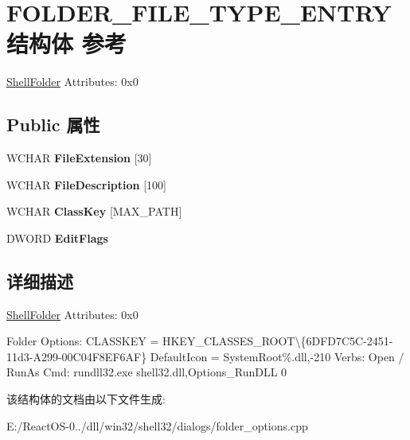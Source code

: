 \hypertarget{struct_f_o_l_d_e_r___f_i_l_e___t_y_p_e___e_n_t_r_y}{}\section{F\+O\+L\+D\+E\+R\+\_\+\+F\+I\+L\+E\+\_\+\+T\+Y\+P\+E\+\_\+\+E\+N\+T\+R\+Y结构体 参考}
\label{struct_f_o_l_d_e_r___f_i_l_e___t_y_p_e___e_n_t_r_y}


\hyperlink{struct_shell_folder}{Shell\+Folder} Attributes\+: 0x0  


\subsection*{Public 属性}
\begin{DoxyCompactItemize}
\item 
\mbox{\label{struct_f_o_l_d_e_r___f_i_l_e___t_y_p_e___e_n_t_r_y_a720540c9fd3743dfba91772a3ced099d}} 
W\+C\+H\+AR {\bfseries File\+Extension} \mbox{[}30\mbox{]}
\item 
\mbox{\label{struct_f_o_l_d_e_r___f_i_l_e___t_y_p_e___e_n_t_r_y_a3d857400d366e9e5c6c05ea0932ad527}} 
W\+C\+H\+AR {\bfseries File\+Description} \mbox{[}100\mbox{]}
\item 
\mbox{\label{struct_f_o_l_d_e_r___f_i_l_e___t_y_p_e___e_n_t_r_y_a45457c59f3a0fe38229e147f98ff8c57}} 
W\+C\+H\+AR {\bfseries Class\+Key} \mbox{[}M\+A\+X\+\_\+\+P\+A\+TH\mbox{]}
\item 
\mbox{\label{struct_f_o_l_d_e_r___f_i_l_e___t_y_p_e___e_n_t_r_y_a0e3193b94f6cab2e4c62dea9241a7f51}} 
D\+W\+O\+RD {\bfseries Edit\+Flags}
\end{DoxyCompactItemize}


\subsection{详细描述}
\hyperlink{struct_shell_folder}{Shell\+Folder} Attributes\+: 0x0 

Folder Options\+: C\+L\+A\+S\+S\+K\+EY = H\+K\+E\+Y\+\_\+\+C\+L\+A\+S\+S\+E\+S\+\_\+\+R\+O\+OT\textbackslash{}\{6\+D\+F\+D7\+C5\+C-\/2451-\/11d3-\/\+A299-\/00\+C04\+F8\+E\+F6\+AF\} Default\+Icon = System\+Root\%.dll,-\/210 Verbs\+: Open / Run\+As Cmd\+: rundll32.\+exe shell32.\+dll,Options\+\_\+\+Run\+D\+LL 0 

该结构体的文档由以下文件生成\+:\begin{DoxyCompactItemize}
\item 
E\+:/\+React\+O\+S-\/0../dll/win32/shell32/dialogs/folder\+\_\+options.\+cpp\end{DoxyCompactItemize}
